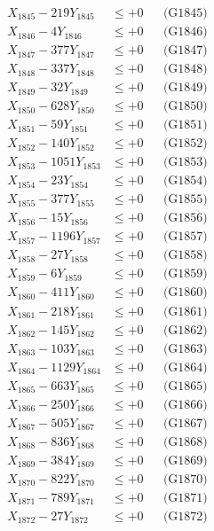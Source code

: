 \documentclass[a4paper,10pt]{article}
\begin{document}
{\begin{align}
X_{1845} - 219Y_{1845} &\leq +0 && \text{(G1845)} \\
X_{1846} - 4Y_{1846} &\leq +0 && \text{(G1846)} \\
X_{1847} - 377Y_{1847} &\leq +0 && \text{(G1847)} \\
X_{1848} - 337Y_{1848} &\leq +0 && \text{(G1848)} \\
X_{1849} - 32Y_{1849} &\leq +0 && \text{(G1849)} \\
X_{1850} - 628Y_{1850} &\leq +0 && \text{(G1850)} \\
\allowbreak
X_{1851} - 59Y_{1851} &\leq +0 && \text{(G1851)} \\
X_{1852} - 140Y_{1852} &\leq +0 && \text{(G1852)} \\
X_{1853} - 1051Y_{1853} &\leq +0 && \text{(G1853)} \\
X_{1854} - 23Y_{1854} &\leq +0 && \text{(G1854)} \\
X_{1855} - 377Y_{1855} &\leq +0 && \text{(G1855)} \\
X_{1856} - 15Y_{1856} &\leq +0 && \text{(G1856)} \\
X_{1857} - 1196Y_{1857} &\leq +0 && \text{(G1857)} \\
X_{1858} - 27Y_{1858} &\leq +0 && \text{(G1858)} \\
X_{1859} - 6Y_{1859} &\leq +0 && \text{(G1859)} \\
X_{1860} - 411Y_{1860} &\leq +0 && \text{(G1860)} \\
\allowbreak
X_{1861} - 218Y_{1861} &\leq +0 && \text{(G1861)} \\
X_{1862} - 145Y_{1862} &\leq +0 && \text{(G1862)} \\
X_{1863} - 103Y_{1863} &\leq +0 && \text{(G1863)} \\
X_{1864} - 1129Y_{1864} &\leq +0 && \text{(G1864)} \\
X_{1865} - 663Y_{1865} &\leq +0 && \text{(G1865)} \\
X_{1866} - 250Y_{1866} &\leq +0 && \text{(G1866)} \\
X_{1867} - 505Y_{1867} &\leq +0 && \text{(G1867)} \\
X_{1868} - 836Y_{1868} &\leq +0 && \text{(G1868)} \\
X_{1869} - 384Y_{1869} &\leq +0 && \text{(G1869)} \\
X_{1870} - 822Y_{1870} &\leq +0 && \text{(G1870)} \\
\allowbreak
X_{1871} - 789Y_{1871} &\leq +0 && \text{(G1871)} \\
X_{1872} - 27Y_{1872} &\leq +0 && \text{(G1872)} \\

\end{align}}
\end{document}
